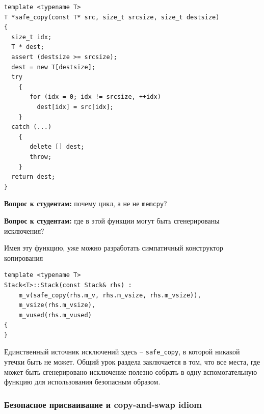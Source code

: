 \documentclass[a4paper,12pt,oneside]{article}
\newif\ifanswers
\begin{document}
\begin{lstlisting}
template <typename T>
T *safe_copy(const T* src, size_t srcsize, size_t destsize)
{
  size_t idx;
  T * dest;
  assert (destsize >= srcsize);
  dest = new T[destsize];
  try 
    {
       for (idx = 0; idx != srcsize, ++idx)
         dest[idx] = src[idx];
    }
  catch (...)
    {
       delete [] dest;
       throw;
    }
  return dest;
}
\end{lstlisting}

\textbf{Вопрос к студентам:} почему цикл, а не не \lstinline!memcpy!?

\ifanswers
Правильный ответ: потому что должны быть вызваны операторы присваивания для \lstinline!T!.
\fi

\textbf{Вопрос к студентам:} где в этой функции могут быть сгенерированы исключения?

\ifanswers
Внутри этой функции исключения могут быть сгенерированы:

\begin{itemize}
\item
В функции \lstinline!new!, переопределённым для \lstinline!T! оператором \lstinline!operator new! или конструктором  \lstinline!T! -- в этом случае никакой памяти выделено не будет и утечки не произойдёт, а исключения покинут  \lstinline!safe_copy!
\item
В функции  \lstinline!operator=! или  \lstinline!operator[]! типа  \lstinline!T! при копировании. В этом случае исключения будут перехвачены, ресурсы освобождены и исключения отпущены дальше.
\end{itemize}
\fi

Имея эту функцию, уже можно разработать симпатичный конструктор копирования

\begin{lstlisting}
template <typename T>
Stack<T>::Stack(const Stack& rhs) : 
    m_v(safe_copy(rhs.m_v, rhs.m_vsize, rhs.m_vsize)),
    m_vsize(rhs.m_vsize), 
    m_vused(rhs.m_vused) 
{
}
\end{lstlisting}

Единственный источник исключений здесь -- \lstinline!safe_copy!, в которой никакой утечки быть не может. Общий урок раздела заключается в том, что все места, где может быть сгенерировано исключение полезно собрать в одну вспомогательную функцию для использования безопасным образом.

\subsubsection{Безопасное присваивание и copy-and-swap idiom}\label{CopySwap}
\end{document}
